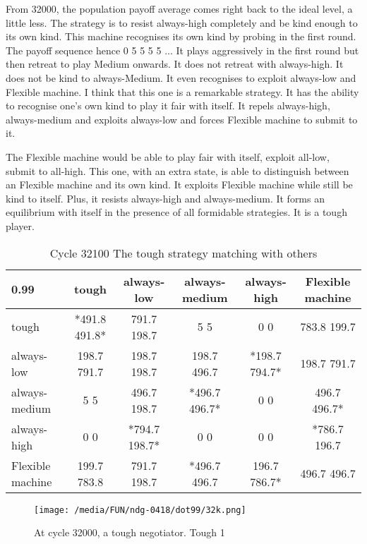 \documentclass[12.5pt]{report}
\begin{document}
From 32000, the population payoff average comes right back to the ideal level, a little less. The strategy is to resist always-high completely and be kind enough to its own kind. This machine recognises its own kind by probing in the first round. The payoff sequence hence 0 5 5 5 5 ... It plays aggressively in the first round but then retreat to play Medium onwards. It does not retreat with always-high. It does not be kind to always-Medium. It even recognises to exploit always-low and Flexible machine. I think that this one is a remarkable strategy. It has the ability to recognise one's own kind to play it fair with itself. It repels always-high, always-medium and exploits always-low and forces Flexible machine to submit to it. 

The Flexible machine would be able to play fair with itself, exploit all-low, submit to all-high. This one, with an extra state, is able to distinguish between an Flexible machine and its own kind. It exploits Flexible machine while still be kind to itself. Plus, it resists always-high and always-medium. It forms an equilibrium with itself in the presence of all formidable strategies. It is a tough player.

\begin{table}[h!]
\center
\begin{tabular}{l|ccccc}
\textbf{0.99}& tough & always-low & always-medium & always-high & Flexible machine\\
\hline

tough & *491.8 491.8*  & 791.7 198.7  &      5 5    &        0 0 &       783.8 199.7  \\
always-low  &  198.7 791.7  &  198.7 198.7  &  198.7 496.7  & *198.7 794.7*  & 198.7 791.7  \\
always-medium  &      5 5 &        496.7 198.7   &*496.7 496.7*&       0 0 &       496.7 496.7* \\
always-high  &      0 0    &   *794.7 198.7*     &  0 0   &        0 0    &   *786.7 196.7  \\
Flexible machine  &  199.7 783.8  &  791.7 198.7  & *496.7 496.7    &196.7 786.7*  & 496.7 496.7 \\
  \end{tabular}
\caption{Cycle 32100 The tough strategy matching with others}
\end{table}


\begin{figure}[h!]
\center
\texttt{[image: /media/FUN/ndg-0418/dot99/32k.png]}
\caption{At cycle 32000, a tough negotiator. Tough 1}
\end{figure}
\end{document}
